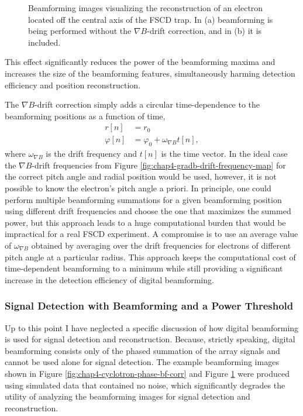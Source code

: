 \begin{figure}[htbp]
\begin{subfigure}{0.45\textwidth}
        \caption{}
    \end{subfigure}
    \caption{Beamforming images visualizing the reconstruction of an electron located off the central axis of the FSCD trap. In (a) beamforming is being performed without the $\nabla B$-drift correction, and in (b) it is included.}
    \label{fig:chap4-gradb-bf-drift-corr}
\end{figure}
This effect significantly reduces the power of the beamforming maxima and increases the size of the beamforming features, simultaneously harming detection efficiency and position reconstruction. 

The $\nabla B$-drift correction simply adds a circular time-dependence to the beamforming positions as a function of time,
\begin{align}
    r[n]&=r_0\\
    \varphi[n]&=\varphi_0 + \omega_{\nabla B}t[n], 
\end{align}
where $\omega_{\nabla B}$ is the drift frequency and $t[n]$ is the time vector. In the ideal case the $\nabla B$-drift frequencies from Figure \ref{fig:chap4-gradb-drift-frequency-map} for the correct pitch angle and radial position would be used, however, it is not possible to know the electron's pitch angle a priori. In principle, one could perform multiple beamforming summations for a given beamforming position using different drift frequencies and choose the one that maximizes the summed power, but this approach leads to a huge computational burden that would be impractical for a real FSCD experiment. A compromise is to use an average value of $\omega_{\nabla B}$ obtained by averaging over the drift frequencies for electrons of different pitch angle at a particular radius. This approach keeps the computational cost of time-dependent beamforming to a minimum while still providing a significant increase in the detection efficiency of digital beamforming.

\subsubsection*{Signal Detection with Beamforming and a Power Threshold}

Up to this point I have neglected a specific discussion of how digital beamforming is used for signal detection and reconstruction. Because, strictly speaking, digital beamforming consists only of the phased summation of the array signals and cannot be used alone for signal detection. The example beamforming images shown in Figure \ref{fig:chap4-cyclotron-phase-bf-corr} and Figure \ref{fig:chap4-gradb-bf-drift-corr} were produced using simulated data that contained no noise, which significantly degrades the utility of analyzing the beamforming images for signal detection and reconstruction. 

